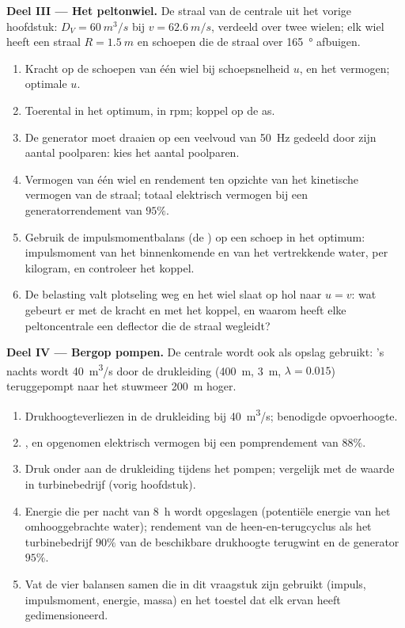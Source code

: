 \begin{problem}
\medskip
\noindent\textbf{Deel III --- Het peltonwiel.}
De straal van de centrale uit het vorige hoofdstuk: $D_V = \qty{60}{m^3/s}$
bij $v =
\qty{62.6}{m/s}$, verdeeld over twee wielen; elk wiel heeft een
straal $R =
\qty{1.5}{m}$ en schoepen die de straal over \qty{165}{\degree}
afbuigen.
\begin{enumerate}[resume]
  \item Kracht op de schoepen van één wiel bij schoepsnelheid $u$, en het
        vermogen; optimale $u$.
  \item Toerental in het optimum, in rpm; koppel op de as.
  \item De generator moet draaien op een veelvoud van \qty{50}{Hz} gedeeld
        door zijn aantal poolparen: kies het aantal poolparen.
  \item Vermogen van één wiel en rendement ten opzichte van het kinetische
        vermogen van de straal; totaal elektrisch vermogen bij een
        generatorrendement van $95\%$.
  \item Gebruik de impulsmomentbalans (de ) op
        een schoep in het optimum: impulsmoment van het binnenkomende en van
        het vertrekkende water, per kilogram, en controleer het koppel.
  \item De belasting valt plotseling weg en het wiel slaat op hol naar
        $u =
        v$: wat gebeurt er met de kracht en met het koppel, en waarom
        heeft elke peltoncentrale een deflector die de straal wegleidt?
\end{enumerate}

\medskip
\noindent\textbf{Deel IV --- Bergop pompen.}
De centrale wordt ook als opslag gebruikt: 's nachts wordt \qty{40}{m^3/s}
door de drukleiding (\qty{400}{m}, \qty{3}{m}, $\lambda = 0.015$)
teruggepompt naar het stuwmeer \qty{200}{m} hoger.
\begin{enumerate}[resume]
  \item Drukhoogteverliezen in de drukleiding bij \qty{40}{m^3/s}; benodigde
        opvoerhoogte.
  \item {}, en opgenomen elektrisch vermogen bij een
        pomprendement van $88\%$.
  \item Druk onder aan de drukleiding tijdens het pompen; vergelijk met de
        waarde in turbinebedrijf (vorig hoofdstuk).
  \item Energie die per nacht van \qty{8}{h} wordt opgeslagen (potentiële
        energie van het omhooggebrachte water); rendement van de
        heen-en-terugcyclus als het turbinebedrijf $90\%$ van de beschikbare
        drukhoogte terugwint en de generator $95\%$.
  \item Vat de vier balansen samen die in dit vraagstuk zijn gebruikt
        (impuls, impulsmoment, energie, massa) en het toestel dat elk ervan
        heeft gedimensioneerd.
\end{enumerate}
\end{problem}
